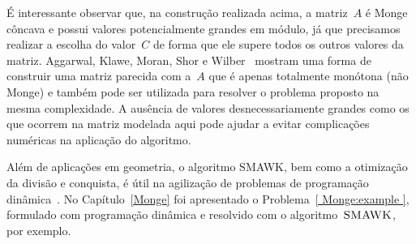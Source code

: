 É interessante observar que, na construção realizada acima, a matriz~$A$ é Monge côncava e possui valores potencialmente grandes em módulo, já que precisamos realizar a escolha do valor~$C$ de forma que ele supere todos os outros valores da matriz. Aggarwal, Klawe, Moran, Shor e Wilber~\cite{Aggarwal:1987} mostram uma forma de construir uma matriz parecida com a~$A$ que é apenas totalmente monótona (não Monge) e também pode ser utilizada para resolver o problema proposto na mesma complexidade. A ausência de valores desnecessariamente grandes como os que ocorrem na matriz modelada aqui pode ajudar a evitar complicações numéricas na aplicação do algoritmo.

Além de aplicações em geometria, o algoritmo SMAWK, bem como a otimização da divisão e conquista, é útil na agilização de problemas de programação dinâmica~\cite{Galil:1989,Galil:1992}. No Capítulo~\ref{Monge} foi apresentado o Problema~\ref{ Monge:example }, formulado com programação dinâmica e resolvido com o algoritmo~$\textsc{SMAWK}$, por exemplo.
